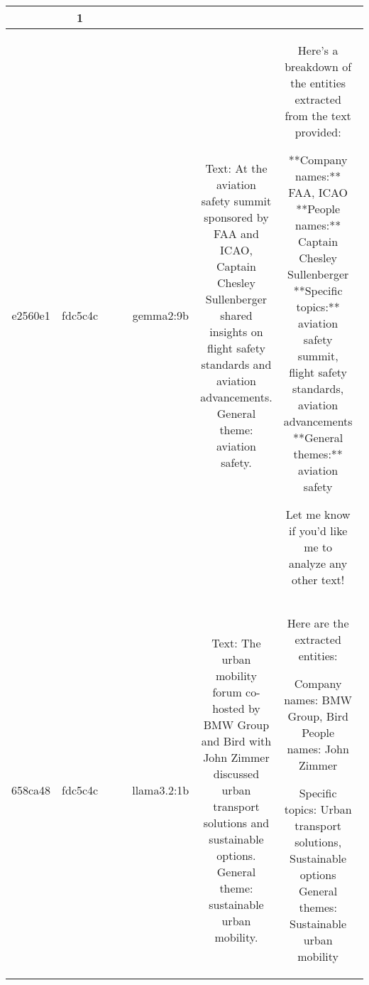 \begin{table}[h!]
\begin{tabular}{|c|c|c|c|c|c|c|c|c|c|}
{1. **Formatting of People Names**: The output uses '-||-' for "People names" which corresponds to the "comma_separated_list_of_people_names" as required by the format if there are no people names. No issue here.
   
2. **Order of Elements**: The output includes all required entities in the specified order: company names, people names, specific topics, and general themes, as specified by the description. 

3. **Output Formatting**: The format for "Company names," "Specific topics", and "General themes" complies with the desired format specified in the description.

Upon review, there does not appear to be direct non-compliance with the description based on the provided output.

No violation.
OK & 1\\
\hline
e2560e1 & fdc5c4c &  &  & gemma2:9b & Text: At the aviation safety summit sponsored by FAA and ICAO, Captain Chesley Sullenberger shared insights on flight safety standards and aviation advancements. General theme: aviation safety. & Here's a breakdown of the entities extracted from the text provided:

**Company names:** FAA, ICAO 
**People names:** Captain Chesley Sullenberger
**Specific topics:** aviation safety summit, flight safety standards, aviation advancements 
**General themes:**  aviation safety 


Let me know if you'd like me to analyze any other text! 
 & err & The chatbot's output has a formatting issue that violates the description provided. According to the description, the extracted elements should be presented in a specific format using <comma_separated_list_of_company_names> and similar placeholders for each category, with the usage of "-||-" to indicate "comma_separated_list." However, the chatbot's output uses bold text and does not incorporate the specified format or placeholders. 

ERR & 1\\
\hline
658ca48 & fdc5c4c &  &  & llama3.2:1b & Text: The urban mobility forum co-hosted by BMW Group and Bird with John Zimmer discussed urban transport solutions and sustainable options. General theme: sustainable urban mobility. & Here are the extracted entities:

Company names: BMW Group, Bird
People names: John Zimmer

Specific topics: Urban transport solutions, Sustainable options
General themes: Sustainable urban mobility & ok & The evaluation of the chatbot's output is based on its compliance with the specified format in the description. The output does not include the "Text: {{text}}" part, which is a minor issue but might not be crucial depending on interpretation. The extracted entities follow the prescribed format, with each category presented and separated by commas where applicable: 

}
\end{tabular}
\end{table}
